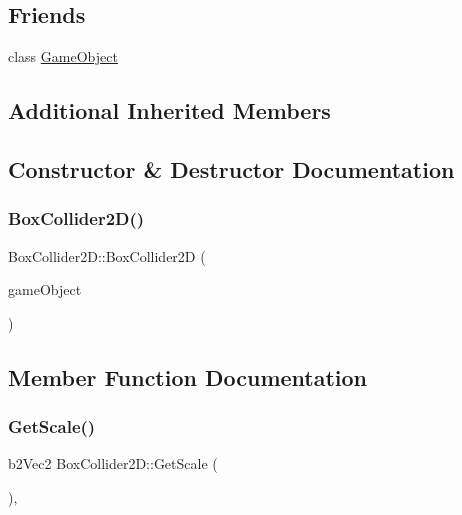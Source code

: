 \subsection*{Friends}
\begin{DoxyCompactItemize}
\item 
class \hyperlink{class_mason_1_1_box_collider2_d_a00df87c957d8f7ee0fc51f07a0542f4a}{Game\+Object}
\end{DoxyCompactItemize}
\subsection*{Additional Inherited Members}


\subsection{Constructor \& Destructor Documentation}
\hypertarget{class_mason_1_1_box_collider2_d_ab74dd3e9b390bd7580e0137503000ac1}{}\label{class_mason_1_1_box_collider2_d_ab74dd3e9b390bd7580e0137503000ac1} 
\subsubsection{\texorpdfstring{Box\+Collider2\+D()}{BoxCollider2D()}}
{\footnotesize\ttfamily Box\+Collider2\+D\+::\+Box\+Collider2D (\begin{DoxyParamCaption}\item[{\hyperlink{class_mason_1_1_game_object}{Game\+Object} $\ast$}]{game\+Object }\end{DoxyParamCaption})\hspace{0.3cm}{\ttfamily [protected]}}



\subsection{Member Function Documentation}
\hypertarget{class_mason_1_1_box_collider2_d_a396aa615690a67c855b5025e3a1b3bce}{}\label{class_mason_1_1_box_collider2_d_a396aa615690a67c855b5025e3a1b3bce} 
\subsubsection{\texorpdfstring{Get\+Scale()}{GetScale()}}
{\footnotesize\ttfamily b2\+Vec2 Box\+Collider2\+D\+::\+Get\+Scale (\begin{DoxyParamCaption}{ }\end{DoxyParamCaption})\hspace{0.3cm}{\ttfamily [override]}, {\ttfamily [virtual]}}



